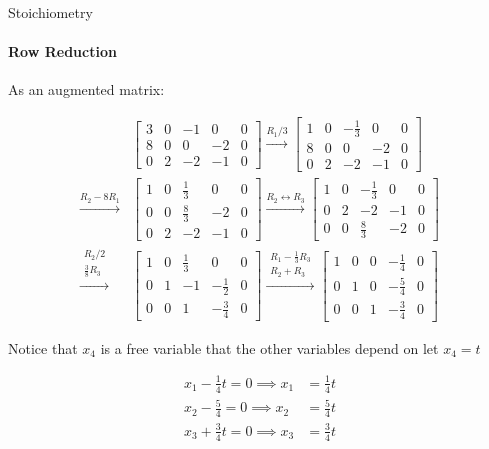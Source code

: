 \documentclass{beamer}
\begin{document}
\begin{frame}{Stoichiometry}
\framesubtitle{Row Reduction}
As an augmented matrix:
{\tiny 
\begin{align*}
&\left[ 
    \begin{array}{cccc|c}
    3 & 0 & -1 & 0 & 0\\
    8 & 0 & 0 & -2 & 0\\
    0 & 2 & -2 & -1 & 0
    \end{array}
\right]
\xrightarrow{R_1/3}
\left[ 
    \begin{array}{cccc|c}
    1 & 0 & -\frac{1}{3} & 0 & 0\\
    8 & 0 & 0 & -2 & 0\\
    0 & 2 & -2 & -1 & 0
    \end{array}
\right] \\
\xrightarrow{R_2 - 8R_1}
&\left[ 
    \begin{array}{cccc|c}
    1 & 0 & \frac{1}{3} & 0 & 0\\
    0 & 0 & \frac{8}{3} & -2 & 0\\
    0 & 2 & -2 & -1 & 0
    \end{array}
\right]
\xrightarrow{R_2 \leftrightarrow R_3}
\left[ 
    \begin{array}{cccc|c}
    1 & 0 & -\frac{1}{3} & 0 & 0\\
    0 & 2 & -2 & -1 & 0\\
    0 & 0 & \frac{8}{3} & -2 & 0
    \end{array}
\right] \\
\xrightarrow{\substack{R_{2}/2 \\ \frac{3}{8}R_{3}}}
&\left[ 
    \begin{array}{cccc|c}
    1 & 0 & \frac{1}{3} & 0 & 0\\
    0 & 1 & -1 & -\frac{1}{2} & 0\\
    0 & 0 & 1 & -\frac{3}{4} & 0
    \end{array}
\right] 
\xrightarrow{\substack{R_{1} - \frac{1}{3}R_3 \\ R_2 + R_3}}
\left[ 
    \begin{array}{cccc|c}
    1 & 0 & 0 & -\frac{1}{4} & 0 \\
    0 & 1 & 0 & -\frac{5}{4} & 0 \\
    0 & 0 & 1 & -\frac{3}{4} & 0
    \end{array}
\right] 
\end{align*}

Notice that $x_4$ is a free variable that the other variables depend on let $x_4 = t$

\begin{align*}
    x_1 - \frac{1}{4}t = 0 \implies x_1 &= \frac{1}{4}t \\
    x_2 - \frac{5}{4} = 0 \implies x_2 &= \frac{5}{4}t \\
    x_3 + \frac{3}{4}t = 0 \implies x_3 &= \frac{3}{4}t
\end{align*}
}
\end{frame}
\end{document}
